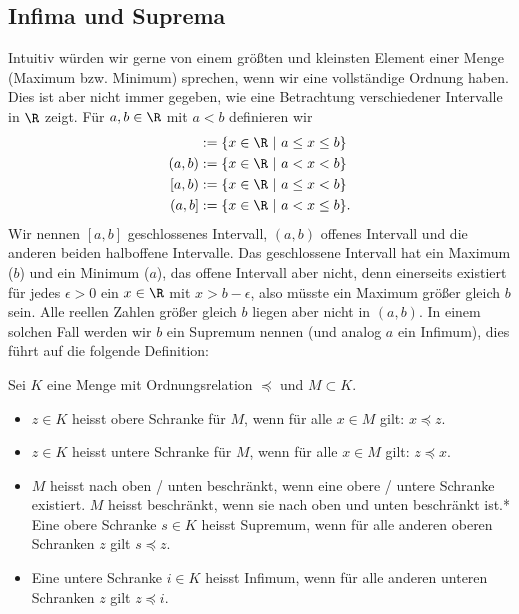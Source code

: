 \documentclass[letterpaper,10pt,english]{jupyterBook}
\begin{document}
\subsection{Infima und Suprema}
\label{\detokenize{grundlagen/zahlensysteme:infima-und-suprema}}
Intuitiv würden wir gerne von einem größten und kleinsten Element einer Menge (Maximum bzw. Minimum) sprechen, wenn wir eine vollständige Ordnung haben. Dies ist aber nicht immer gegeben, wie eine Betrachtung verschiedener Intervalle in \(\R\) zeigt. Für \(a,b \in \R\) mit \(a < b\) definieren wir
\begin{align*}
[a,b] &:= \{x \in \R~|~a \leq x \leq b\} \\
(a,b) &:= \{x \in \R~|~a < x < b\} \\
[a,b) &:= \{x \in \R~|~a \leq x < b\} \\
(a,b] &:= \{x \in \R~|~a < x \leq b\}.
\end{align*}
Wir nennen \([a,b]\) geschlossenes Intervall, \((a,b)\) offenes Intervall und die anderen beiden halboffene Intervalle. Das geschlossene Intervall hat ein Maximum (\(b\)) und ein Minimum (\(a\)), das offene Intervall aber nicht, denn einerseits existiert für jedes \(\epsilon > 0\) ein \(x \in \R\) mit \(x>b-\epsilon\), also müsste ein Maximum größer gleich \(b\) sein. Alle reellen Zahlen größer gleich \(b\) liegen aber nicht in \((a,b)\). In einem solchen Fall werden wir \(b\) ein Supremum nennen (und analog \(a\) ein Infimum), dies führt auf die folgende Definition:
\label{grundlagen/zahlensysteme:definition-27}
\begin{definition}{}{}



Sei \(K\) eine Menge mit Ordnungsrelation \(\preceq\) und \(M \subset K\).
\begin{itemize}
\item {} 
\(z \in K\) heisst obere Schranke für \(M\), wenn für alle \(x \in M\) gilt: \(x \preceq z\).

\item {} 
\(z \in K\) heisst untere Schranke für \(M\), wenn für alle \(x \in M\) gilt: \(z \preceq x\).

\item {} 
\(M\) heisst nach oben / unten beschränkt, wenn eine obere / untere Schranke existiert. \(M\) heisst beschränkt, wenn sie nach oben und unten beschränkt ist.* Eine obere Schranke \(s \in K\) heisst Supremum, wenn für alle anderen oberen Schranken \(z\) gilt \(s \preceq z\).

\item {} 
Eine untere Schranke \(i \in K\) heisst Infimum, wenn für alle anderen unteren Schranken \(z\) gilt \(z \preceq i\).

\end{itemize}
\end{definition}
\end{document}
